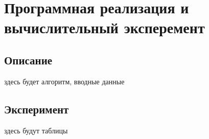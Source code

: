 \chapter{Программная реализация и вычислительный эксперемент}
\section{Описание}
здесь будет алгоритм, вводные данные
\section{Эксперимент}
здесь будут таблицы
